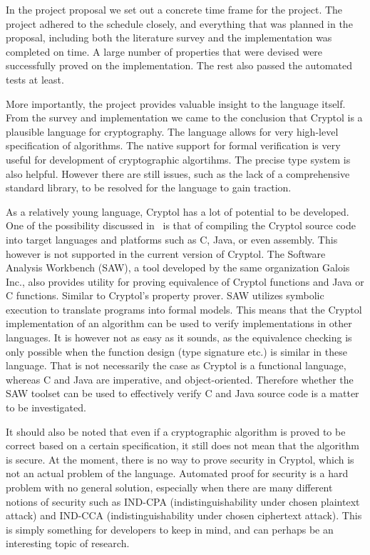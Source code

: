 \documentclass[a4paper, notitlepage]{report}
\begin{document}
In the project proposal we set out a concrete time frame for the project.
The project adhered to the schedule closely, and everything 
that was planned in the proposal, including both the literature survey and 
the implementation was completed on time.
A large number of properties that were devised were successfully proved on
the implementation. The rest also passed the automated tests at least.

More importantly, the project provides valuable insight to the language itself.
From the survey
and implementation we came to the conclusion that Cryptol is a plausible language 
for cryptography.
The language allows for very high-level specification of algorithms.
The native support for formal verification is very useful
for development of cryptographic algortihms. The precise type system is also 
helpful. However there are still issues, such as the lack of a comprehensive standard 
library, to be resolved for the language to gain traction. 

As a relatively young language, Cryptol has a lot of potential to be developed. 
One of the possibility discussed in~\cite{lewis2003cryptol} is that of compiling 
the Cryptol source code into target languages and platforms such as C, Java, or
even assembly. This however is not supported in the current version of Cryptol.
The Software Analysis Workbench (SAW), a tool developed by the same
organization Galois Inc., also provides utility for proving equivalence of Cryptol 
functions and Java or C functions. 
Similar to Cryptol's property prover. SAW utilizes symbolic execution to
translate programs into formal models.
This means that the Cryptol implementation of an algorithm can be used to verify 
implementations in other languages. It is however not as easy as it sounds, 
as the equivalence checking is only possible when the function design (type signature
etc.)
is similar in these language. That is not necessarily the case as Cryptol
is a functional language, whereas C and Java are imperative, and object-oriented.
Therefore whether the SAW toolset can be used to effectively verify C and Java source
code is a matter to be investigated.

It should also be noted that even if a cryptographic algorithm is proved
to be correct based on a certain 
specification, it still does
not mean that the algorithm is secure. 
At the moment, there is no way to prove security in Cryptol, 
which is not an actual problem of the language. 
Automated proof for security is a hard problem with no general solution, 
especially when there are many different notions of security such as 
IND-CPA (indistinguishability under chosen plaintext attack) and 
IND-CCA (indistinguishability under chosen ciphertext attack).
This is simply something for developers to keep in mind, and can perhaps
be an interesting topic of research.


\newpage



\end{document}
